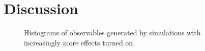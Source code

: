 \section{Discussion}%
\label{sec:disco}
\begin{figure}[ht]
  \centering
  \begin{subfigure}[t]{.49\textwidth}
  \end{subfigure}
  \begin{subfigure}[t]{.49\textwidth}
  \end{subfigure}
  \begin{subfigure}[t]{.49\textwidth}
  \end{subfigure}
  \begin{subfigure}[t]{.49\textwidth}
  \end{subfigure}
  \begin{subfigure}[t]{.49\textwidth}
  \end{subfigure}
  \begin{subfigure}[t]{.49\textwidth}
  \end{subfigure}
\end{figure}
%
\begin{figure}[t]
  \centering \ContinuedFloat
  \begin{subfigure}[t]{.49\textwidth}
  \end{subfigure}
  \begin{subfigure}[t]{.49\textwidth}
  \end{subfigure}
  \begin{subfigure}[t]{.49\textwidth}
  \end{subfigure}
  \begin{subfigure}[t]{.49\textwidth}
  \end{subfigure}
  \caption{\label{fig:holhistos} Histograms of observables generated
    by simulations with increasingly more effects turned on.}
\end{figure}

